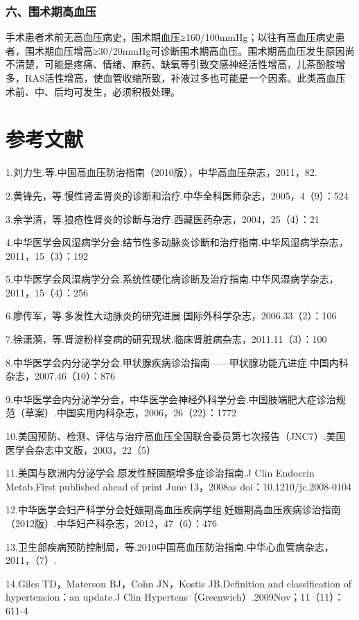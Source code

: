 \subsubsection{六、围术期高血压}

手术患者术前无高血压病史，围术期血压≥160/100mmHg；以往有高血压病史患者，围术期血压增高≥30/20mmHg可诊断围术期高血压。围术期高血压发生原因尚不清楚，可能是疼痛、情绪、麻药、缺氧等引致交感神经活性增高，儿茶酚胺增多，RAS活性增高，使血管收缩所致，补液过多也可能是一个因素。此类高血压术前、中、后均可发生，必须积极处理。

\protect\hypertarget{text00114.html}{}{}

\section{参考文献}

1.刘力生.等.中国高血压防治指南（2010版），中华高血压杂志，2011，82.

2.黄锋先，等.慢性肾盂肾炎的诊断和治疗.中华全科医师杂志，2005，4（9）：524

3.余学清，等.狼疮性肾炎的诊断与治疗.西藏医药杂志，2004，25（4）：21

4.中华医学会风湿病学分会.结节性多动脉炎诊断和治疗指南.中华风湿病学杂志，2011，15（3）：192

5.中华医学会风湿病学分会.系统性硬化病诊断及治疗指南.中华风湿病学杂志，2011，15（4）：256

6.廖传军，等.多发性大动脉炎的研究进展.国际外科学杂志，2006.33（2）：106

7.徐潇漪，等.肾淀粉样变病的研究现状.临床肾脏病杂志，2011.11（3）：100

8.中华医学会内分泌学分会.甲状腺疾病诊治指南------甲状腺功能亢进症.中国内科杂志，2007.46（10）：876

9.中华医学会内分泌学分会，中华医学会神经外科学分会.中国肢端肥大症诊治规范（草案）.中国实用内科杂志，2006，26（22）：1772

10.美国预防、检测、评估与治疗高血压全国联合委员第七次报告（JNC7）.美国医学会杂志中文版，2003，22（5）

11.美国与欧洲内分泌学会.原发性醛固酮增多症诊治指南.J Clin Endocrin
Metab.First published ahead of print June 13，2008as
doi：10.1210/jc.2008-0104

12.中华医学会妇产科学分会妊娠期高血压疾病学组.妊娠期高血压疾病诊治指南（2012版）.中华妇产科杂志，2012，47（6）：476

13.卫生部疾病预防控制局，等.2010中国高血压防治指南.中华心血管病杂志，2011，（7）.

14.Giles TD，Materson BJ，Cohn JN，Kostis JB.Definition and
classification of hypertension：an update.J Clin
Hypertens（Greenwich）.2009Nov；11（11）：611-4

\protect\hypertarget{text00115.html}{}{}

